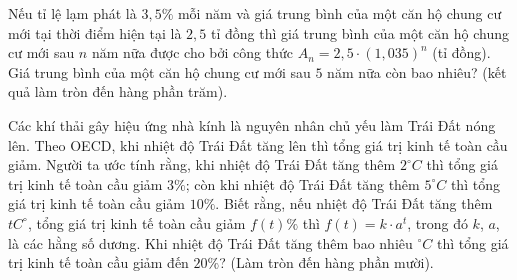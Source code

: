 \begin{ex}%
	 Nếu tỉ lệ lạm phát là $3{,}5\%$ mỗi năm và giá trung bình của một căn hộ chung cư mới tại thời điểm hiện tại là $2{,}5$ tỉ đồng thì giá trung bình của một căn hộ chung cư mới sau $n$ năm nữa được cho bởi công thức $A_n=2{,}5\cdot(1{,}035)^n$ (tỉ đồng). Giá trung bình của một căn hộ chung cư mới sau $5$ năm nữa còn bao nhiêu? (kết quả làm tròn đến hàng phần trăm).
\end{ex}

\begin{ex}%
	Các khí thải gây hiệu ứng nhà kính là nguyên nhân chủ yếu làm Trái Đất nóng lên. Theo OECD, khi nhiệt độ Trái Đất tăng lên thì tổng giá trị kinh tế toàn cầu giảm. Người ta ước tính rằng, khi nhiệt độ Trái Đất tăng thêm $2^\circ C $ thì tổng giá trị kinh tế toàn cầu giảm $3\%$; còn khi nhiệt  độ Trái Đất tăng thêm $5^\circ C$ thì tổng giá trị kinh tế toàn cầu giảm $10\%$. Biết rằng, nếu nhiệt độ Trái Đất tăng thêm $t C^\circ$, tổng giá trị kinh tế toàn cầu giảm $f(t)\%$ thì $f(t)=k \cdot a^t$, trong đó $k$, $a$, là các hằng số dương. Khi nhiệt độ Trái Đất tăng thêm bao nhiêu $^\circ C$ thì tổng giá trị kinh tế toàn cầu giảm đến $20\%$? (Làm tròn đến hàng phần mười).
\end{ex}



